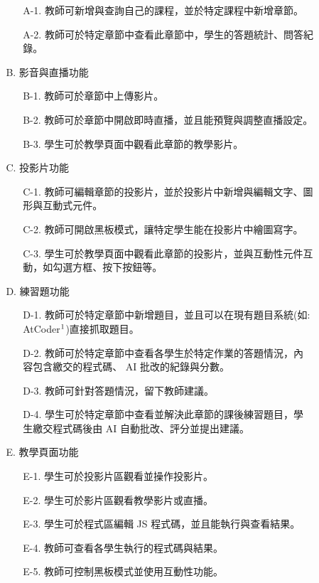 \documentclass[12pt]{article}
\begin{document}
\begin{enumerate}
\begin{enumerate}
\begin{enumerate}[itemindent=24pt]
            \begin{enumerate}[itemindent=24pt]
              \item [A-1.] 教師可新增與查詢自己的課程，並於特定課程中新增章節。
              \item [A-2.] 教師可於特定章節中查看此章節中，學生的答題統計、問答紀錄。
            \end{enumerate}
          \item [B.] 影音與直播功能
            \begin{enumerate}[itemindent=24pt]
              \item [B-1.] 教師可於章節中上傳影片。
              \item [B-2.] 教師可於章節中開啟即時直播，並且能預覽與調整直播設定。
              \item [B-3.] 學生可於教學頁面中觀看此章節的教學影片。
            \end{enumerate}
          \item [C.] 投影片功能
            \begin{enumerate}[itemindent=24pt]
              \item [C-1.] 教師可編輯章節的投影片，並於投影片中新增與編輯文字、圖形與互動式元件。
              \item [C-2.] 教師可開啟黑板模式，讓特定學生能在投影片中繪圖寫字。
              \item [C-3.] 學生可於教學頁面中觀看此章節的投影片，並與互動性元件互動，如勾選方框、按下按鈕等。
            \end{enumerate}
          \item [D.] 練習題功能
            \begin{enumerate}[itemindent=24pt]
              \item [D-1.] 教師可於特定章節中新增題目，並且可以在現有題目系統(如: AtCoder$\footnote{https://atcoder.jp/}$)直接抓取題目。
              \item [D-2.] 教師可於特定章節中查看各學生於特定作業的答題情況，內容包含繳交的程式碼、 AI 批改的紀錄與分數。
              \item [D-3.] 教師可針對答題情況，留下教師建議。
              \item [D-4.] 學生可於特定章節中查看並解決此章節的課後練習題目，學生繳交程式碼後由 AI 自動批改、評分並提出建議。
            \end{enumerate}
          \item [E.] 教學頁面功能
            \begin{enumerate}[itemindent=24pt]
              \item [E-1.] 學生可於投影片區觀看並操作投影片。
              \item [E-2.] 學生可於影片區觀看教學影片或直播。
              \item [E-3.] 學生可於程式區編輯 JS 程式碼，並且能執行與查看結果。
              \item [E-4.] 教師可查看各學生執行的程式碼與結果。
              \item [E-5.] 教師可控制黑板模式並使用互動性功能。
            \end{enumerate}
          \end{enumerate}


\end{enumerate}
\end{enumerate}
\end{document}
